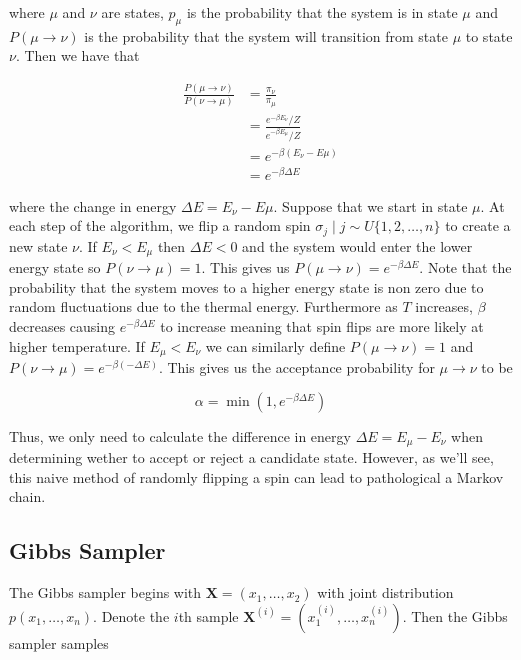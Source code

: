 \documentclass{article}
\begin{document}
where $\mu$ and $\nu$ are states, $p_{\mu}$ is the probability that the system is in state $\mu$ and $P(\mu \rightarrow \nu)$
is the probability that the system will transition from state $\mu$ to state $\nu$. Then we have that 

\begin{align}
    \frac{P(\mu \rightarrow \nu)}{P(\nu \rightarrow \mu)}
    &= \frac{\pi_{\nu}}{\pi_{\mu}} \\
    &= \frac{e^{-\beta E_{\nu}} / Z}{e^{-\beta E_{\mu}} / Z} \\
    &= e^{-\beta(E_{\nu} - E{\mu})} \\
    &= e^{-\beta \Delta E}
\end{align}

where the change in energy $\Delta E = E_{\nu} - E{\mu}$. Suppose that we start in state $\mu$. At each step of the algorithm, we flip a random spin $\sigma_j \mid j \sim U\{1,2,\ldots,n\}$ to create a new state $\nu$.
If $E_{\nu} < E_{\mu}$ then $\Delta E < 0$ and the system would enter the lower energy state so $P(\nu \rightarrow \mu) = 1$. This gives us
$P(\mu \rightarrow \nu) = e^{-\beta \Delta E}$. Note that the probability that the system moves to a higher energy state 
is non zero due to random fluctuations due to the thermal energy. Furthermore as $T$ increases, $\beta$ decreases causing $e^{-\beta \Delta E}$
to increase meaning that spin flips are more likely at higher temperature. If $E_{\mu} < E_{\nu}$ we can similarly define $P(\mu \rightarrow \nu) = 1$
and $P(\nu \rightarrow \mu) = e^{-\beta(-\Delta E)}$. This gives us the acceptance probability for $\mu \rightarrow \nu$ to be

\begin{equation}
    \alpha = \min(1, e^{-\beta \Delta E})
\end{equation}

Thus, we only need to calculate the difference in energy $\Delta E = E_{\mu} - E_{\nu}$ when determining wether to accept or reject a candidate state.
However, as we'll see, this naive method of randomly flipping a spin can lead to pathological a Markov chain.

\subsection{Gibbs Sampler}
The Gibbs sampler begins with $\mathbf{X} = (x_1, \ldots, x_2)$ with joint distribution $p(x_1, \ldots, x_n)$. Denote the $i$th sample
$\mathbf{X}^{(i)} = (x_1^{(i)}, \ldots, x_n^{(i)})$. Then the Gibbs sampler samples
\end{document}

